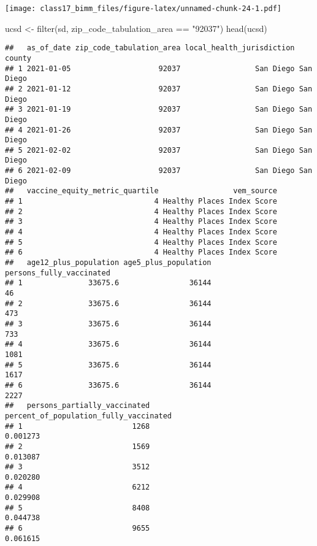 \documentclass[
]{article}
\newenvironment{Shaded}{\begin{snugshade}}{\end{snugshade}}
\newcommand{\FunctionTok}[1]{\textcolor[rgb]{0.00,0.00,0.00}{#1}}
\newcommand{\NormalTok}[1]{#1}
\newcommand{\OtherTok}[1]{\textcolor[rgb]{0.56,0.35,0.01}{#1}}
\newcommand{\SpecialCharTok}[1]{\textcolor[rgb]{0.00,0.00,0.00}{#1}}
\newcommand{\StringTok}[1]{\textcolor[rgb]{0.31,0.60,0.02}{#1}}
\begin{document}
\texttt{[image: class17\_bimm\_files/figure-latex/unnamed-chunk-24-1.pdf]}

\begin{Shaded}
\begin{Highlighting}[]
\NormalTok{ucsd }\OtherTok{\textless{}{-}} \FunctionTok{filter}\NormalTok{(sd, zip\_code\_tabulation\_area }\SpecialCharTok{==} \StringTok{"92037"}\NormalTok{)}
\FunctionTok{head}\NormalTok{(ucsd)}
\end{Highlighting}
\end{Shaded}

\begin{verbatim}
##   as_of_date zip_code_tabulation_area local_health_jurisdiction    county
## 1 2021-01-05                    92037                 San Diego San Diego
## 2 2021-01-12                    92037                 San Diego San Diego
## 3 2021-01-19                    92037                 San Diego San Diego
## 4 2021-01-26                    92037                 San Diego San Diego
## 5 2021-02-02                    92037                 San Diego San Diego
## 6 2021-02-09                    92037                 San Diego San Diego
##   vaccine_equity_metric_quartile                 vem_source
## 1                              4 Healthy Places Index Score
## 2                              4 Healthy Places Index Score
## 3                              4 Healthy Places Index Score
## 4                              4 Healthy Places Index Score
## 5                              4 Healthy Places Index Score
## 6                              4 Healthy Places Index Score
##   age12_plus_population age5_plus_population persons_fully_vaccinated
## 1               33675.6                36144                       46
## 2               33675.6                36144                      473
## 3               33675.6                36144                      733
## 4               33675.6                36144                     1081
## 5               33675.6                36144                     1617
## 6               33675.6                36144                     2227
##   persons_partially_vaccinated percent_of_population_fully_vaccinated
## 1                         1268                               0.001273
## 2                         1569                               0.013087
## 3                         3512                               0.020280
## 4                         6212                               0.029908
## 5                         8408                               0.044738
## 6                         9655                               0.061615

\end{verbatim}
\end{document}
